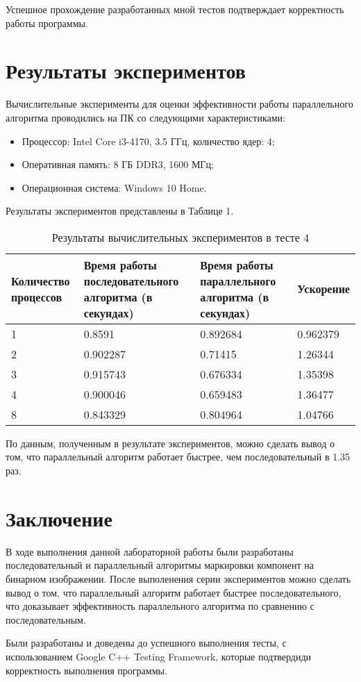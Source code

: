\documentclass{report}
\begin{document}
\par Успешное прохождение разработанных мной тестов подтверждает корректность работы программы.
\newpage

\section*{Результаты экспериментов}
Вычислительные эксперименты для оценки эффективности работы параллельного алгоритма проводились на ПК со следующими характеристиками:
\begin{itemize}
\item Процессор: Intel Core i3-4170, 3.5 ГГц, количество ядер: 4;
\item Оперативная память: 8 ГБ DDR3, 1600  МГц;
\item Операционная система: Windows 10 Home.
\end{itemize}

\par Результаты экспериментов представлены в Таблице 1.

\begin{table}[!h]
\caption{Результаты вычислительных экспериментов в тесте 4}
\centering
\begin{tabular}{| p{2cm} | p{3cm} | p{4cm} | p{2cm} |}
\hline
Количество процессов & Время работы последовательного алгоритма (в секундах) & Время работы параллельного алгоритма (в секундах) & Ускорение  \\[5pt]
\hline
1        & 0.8591        & 0.892684     & 0.962379       \\
2        & 0.902287        & 0.71415     & 1.26344       \\
3        & 0.915743        & 0.676334     & 1.35398       \\
4        & 0.900046        & 0.659483     & 1.36477       \\
8        & 0.843329        & 0.804964     & 1.04766	  \\
\hline
\end{tabular}
\end{table}
По данным, полученным в результате экспериментов, можно сделать вывод о том,
что параллельный алгоритм работает быстрее, чем последовательный в 1.35 раз.

\newpage

\section*{Заключение}
В ходе выполнения данной лабораторной работы были разработаны последовательный и параллельный алгоритмы маркировки компонент на бинарном изображении. После выполенения серии экспериментов можно сделать вывод о том, что параллельный алгоритм работает быстрее последовательного, что доказывает эффективность параллельного алгоритма по сравнению с последовательным.
\par Были разработаны и доведены до успешного выполнения тесты,  с использованием Google C++ Testing Framework, которые  подтвердиди корректность выполнения  программы.
\newpage
\end{document}
